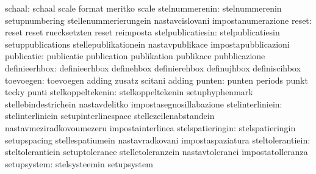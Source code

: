                           schaal: schaal                           scale
                                  format                           meritko
                                  scale                            %
                  stelnummerenin: stelnummerenin                   setupnumbering
                                  stellenummerierungein            nastavcislovani
                                  impostanumerazione
                           reset: reset                            reset
                                  ruecksetzten                     reset
                                  reimposta
               stelpublicatiesin: stelpublicatiesin                setuppublications
                                  stellepublikationein             nastavpublikace
                                  impostapubblicazioni
                      publicatie: publicatie                       publication
                                  publikation                      publikace
                                  pubblicazione
                   definieerhbox: definieerhbox                    definehbox
                                  definierehbox                    definujhbox
                                  definiscihbox
                       toevoegen: toevoegen                        adding
                                  zusatz                           scitani
                                  adding                           %
                          punten: punten                           periods
                                  punkt                            tecky
                                  punti
               stelkoppeltekenin: stelkoppeltekenin                setuphyphenmark
                                  stellebindestrichein             nastavdelitko
                                  impostasegnosillabazione         %
                stelinterliniein: stelinterliniein                 setupinterlinespace
                                  stellezeilenabstandein           nastavmeziradkovoumezeru
                                  impostainterlinea
                stelspatieringin: stelspatieringin                 setupspacing
                                  stellespatiumein                 nastavradkovani
                                  impostaspaziatura
                steltolerantiein: steltolerantiein                 setuptolerance
                                  stelletoleranzein                nastavtoleranci
                                  impostatolleranza
                     setupsystem: stelsysteemin                    setupsystem
